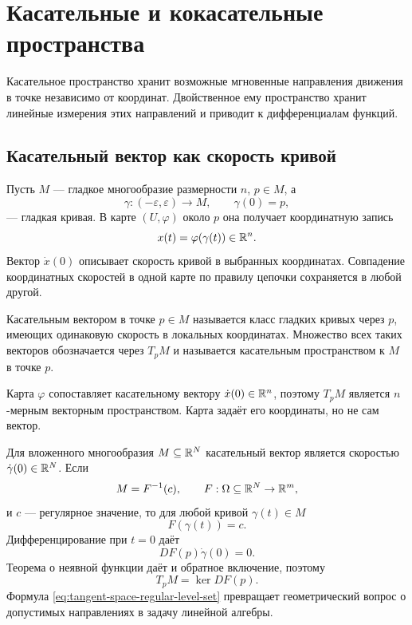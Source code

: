 \section{Касательные и кокасательные пространства}
\label{sec:tangent-cotangent-spaces}

Касательное пространство хранит возможные мгновенные направления движения в точке независимо от координат. Двойственное ему пространство хранит линейные измерения этих направлений и приводит к дифференциалам функций.

\subsection{Касательный вектор как скорость кривой}

Пусть \(M\) --- гладкое многообразие размерности \(n\), \(p\in M\), а
\[
\gamma:(-\varepsilon,\varepsilon)\to M,
\qquad
\gamma(0)=p,
\]
--- гладкая кривая. В карте \((U,\varphi)\) около \(p\) она получает координатную запись
\[
x(t)=\varphi(\gamma(t))\in\mathbb{R}^n.
\]
Вектор \(\dot x(0)\) описывает скорость кривой в выбранных координатах. Совпадение координатных скоростей в одной карте по правилу цепочки сохраняется в любой другой.

\begin{definition}
Касательным вектором в точке \(p\in M\) называется класс гладких кривых через \(p\), имеющих одинаковую скорость в локальных координатах. Множество всех таких векторов обозначается через \(T_pM\) и называется касательным пространством к \(M\) в точке \(p\).
\end{definition}

Карта \(\varphi\) сопоставляет касательному вектору \(\dot x(0)\in\mathbb{R}^n\), поэтому \(T_pM\) является \(n\)-мерным векторным пространством. Карта задаёт его координаты, но не сам вектор.

Для вложенного многообразия \(M\subseteq\mathbb{R}^N\) касательный вектор является скоростью \(\dot\gamma(0)\in\mathbb{R}^N\). Если
\[
M=F^{-1}(c),
\qquad
F:\Omega\subseteq\mathbb{R}^N\to\mathbb{R}^m,
\]
и \(c\) --- регулярное значение, то для любой кривой \(\gamma(t)\in M\)
\[
F(\gamma(t))=c.
\]
Дифференцирование при \(t=0\) даёт
\[
DF(p)\dot\gamma(0)=0.
\]
Теорема о неявной функции даёт и обратное включение, поэтому
\begin{equation}
\label{eq:tangent-space-regular-level-set}
\boxed{
T_pM=\ker DF(p)
}.
\end{equation}
Формула \eqref{eq:tangent-space-regular-level-set} превращает геометрический вопрос о допустимых направлениях в задачу линейной алгебры.

